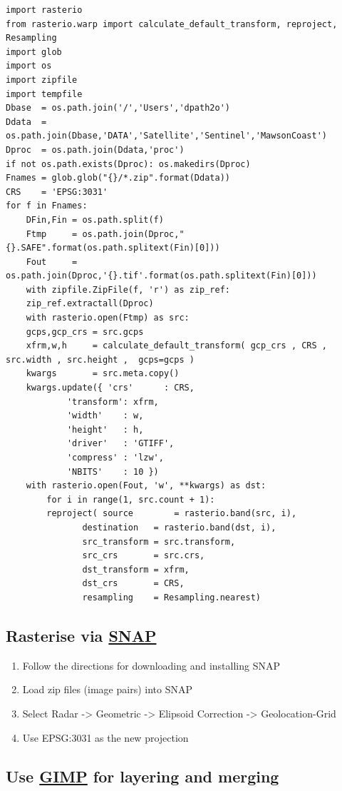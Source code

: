 \documentclass[11pt]{article}
\begin{document}
\begin{verbatim}
import rasterio
from rasterio.warp import calculate_default_transform, reproject, Resampling
import glob
import os
import zipfile
import tempfile
Dbase  = os.path.join('/','Users','dpath2o')
Ddata  = os.path.join(Dbase,'DATA','Satellite','Sentinel','MawsonCoast')
Dproc  = os.path.join(Ddata,'proc')
if not os.path.exists(Dproc): os.makedirs(Dproc)
Fnames = glob.glob("{}/*.zip".format(Ddata))
CRS    = 'EPSG:3031'
for f in Fnames:
    DFin,Fin = os.path.split(f)
    Ftmp     = os.path.join(Dproc,"{}.SAFE".format(os.path.splitext(Fin)[0]))
    Fout     = os.path.join(Dproc,'{}.tif'.format(os.path.splitext(Fin)[0]))
    with zipfile.ZipFile(f, 'r') as zip_ref:
	zip_ref.extractall(Dproc)
    with rasterio.open(Ftmp) as src:
	gcps,gcp_crs = src.gcps
	xfrm,w,h     = calculate_default_transform( gcp_crs , CRS , src.width , src.height ,  gcps=gcps )
	kwargs       = src.meta.copy()
	kwargs.update({ 'crs'      : CRS,
			'transform': xfrm,
			'width'    : w,
			'height'   : h,
			'driver'   : 'GTIFF',
			'compress' : 'lzw',
			'NBITS'    : 10 })
	with rasterio.open(Fout, 'w', **kwargs) as dst:
	    for i in range(1, src.count + 1):
		reproject( source        = rasterio.band(src, i),
			   destination   = rasterio.band(dst, i),
			   src_transform = src.transform,
			   src_crs       = src.crs,
			   dst_transform = xfrm,
			   dst_crs       = CRS,
			   resampling    = Resampling.nearest)
\end{verbatim}

\subsection{Rasterise via \href{https://step.esa.int/main/download/snap-download/}{SNAP}}
\label{sec:orgf15dc9c}

\begin{enumerate}
\item Follow the directions for downloading and installing SNAP
\item Load zip files (image pairs) into SNAP
\item Select Radar -> Geometric -> Elipsoid Correction -> Geolocation-Grid
\item Use EPSG:3031 as the new projection
\end{enumerate}

\subsection{Use \href{https://www.gimp.org}{GIMP} for layering and merging}
\label{sec:orgffd28e8}
\end{document}
